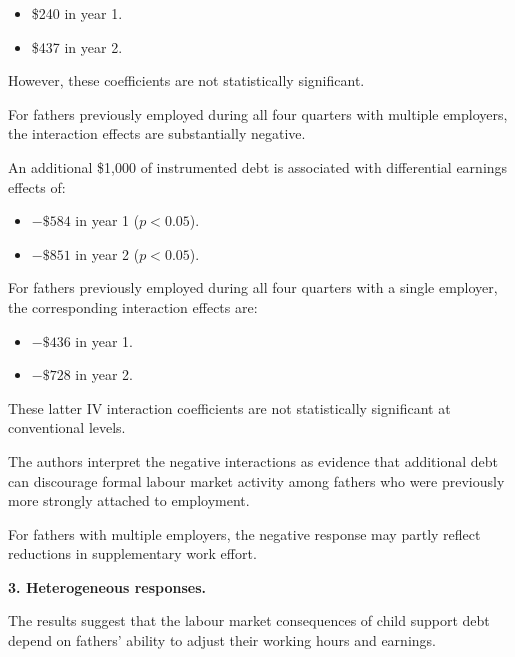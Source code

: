 \documentclass{article}
\begin{document}
\begin{itemize}

    \item \$240 in year 1.

    \item \$437 in year 2.

\end{itemize}

However, these coefficients are
not statistically significant.

For fathers previously employed
during all four quarters with
multiple employers, the interaction
effects are substantially negative.

An additional \$1,000 of
instrumented debt is associated
with differential earnings effects of:

\begin{itemize}

    \item $-\$584$ in year 1
    ($p<0.05$).

    \item $-\$851$ in year 2
    ($p<0.05$).

\end{itemize}

For fathers previously employed
during all four quarters with
a single employer, the corresponding
interaction effects are:

\begin{itemize}

    \item $-\$436$ in year 1.

    \item $-\$728$ in year 2.

\end{itemize}

These latter IV interaction
coefficients are not statistically
significant at conventional levels.

The authors interpret the negative
interactions as evidence that
additional debt can discourage
formal labour market activity
among fathers who were previously
more strongly attached to employment.

For fathers with multiple employers,
the negative response may partly
reflect reductions in supplementary
work effort.

\medskip

\noindent
\textbf{3. Heterogeneous responses.}

The results suggest that the
labour market consequences of
child support debt depend on
fathers' ability to adjust
their working hours and earnings.
\end{document}
